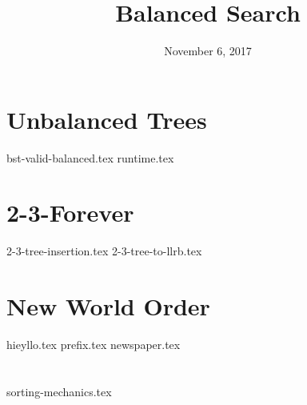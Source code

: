 \documentclass[11pt]{exam}
\title{Balanced Search}
\date{November 6, 2017}
\begin{document}
\maketitle

\section{Unbalanced Trees}
\begin{questions}
{bst-valid-balanced.tex}
{runtime.tex}
\end{questions}

\section{2-3-Forever}
\begin{questions}
{2-3-tree-insertion.tex}
{2-3-tree-to-llrb.tex}
\end{questions}

\section{New World Order}
\begin{questions}
{hieyllo.tex}
{prefix.tex}
{newspaper.tex}
\end{questions}

\clearpage

\section{}
\begin{questions}
{sorting-mechanics.tex}
\end{questions}
\end{document}
